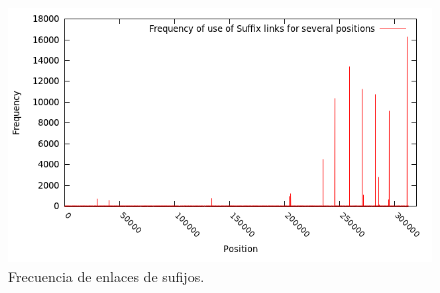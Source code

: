 \documentclass[11pt,a4paper,english]{article}
\begin{document}
\begin{figure}[h] 
\begin{center}
\includegraphics[scale=0.4]{histogram.png}
\caption{Frecuencia de enlaces de sufijos.}
\label{fig:hist_sl2}
\end{center}
\end{figure}
\end{document}
